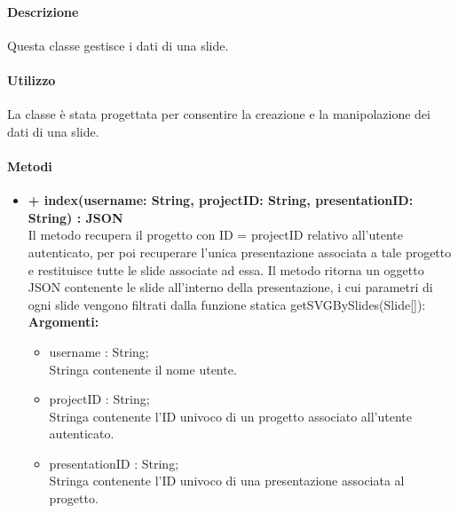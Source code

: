 	\paragraph{Descrizione}
		Questa classe gestisce i dati di una \gls{slide}.
	\paragraph{Utilizzo}
		La classe è stata progettata per consentire la creazione e la manipolazione dei dati di una \gls{slide}.

	\paragraph{Metodi}
		\begin{itemize}
			\item \textbf{+ index(username: String, projectID: String, presentationID: String) : \gls{JSON}}\\
				Il metodo recupera il progetto con ID = projectID relativo all'utente autenticato, per poi recuperare l'unica presentazione associata a tale progetto e restituisce tutte le \gls{slide} associate ad essa. Il metodo ritorna un oggetto \gls{JSON} contenente le \gls{slide} all'interno della presentazione, i cui parametri di ogni slide vengono filtrati dalla funzione statica getSVGBySlides(Slide[]):\\
				\textbf{Argomenti:}
				\begin{itemize}
					\item username : String; \\
					Stringa contenente il nome utente.
					\item projectID : String; \\
					Stringa contenente l'ID univoco di un progetto associato all'utente autenticato.
					\item presentationID : String; \\
					Stringa contenente l'ID univoco di una presentazione associata al progetto.
				\end{itemize}
				

\end{itemize}
